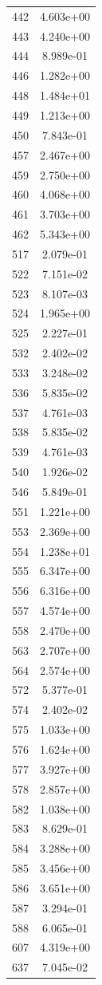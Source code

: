 \documentclass[12pt]{article}
\begin{document}
\begin{longtable}{@{}cc@{}}
442 & 4.603e+00 \\
443 & 4.240e+00 \\
444 & 8.989e-01 \\
446 & 1.282e+00 \\
448 & 1.484e+01 \\
449 & 1.213e+00 \\
450 & 7.843e-01 \\
457 & 2.467e+00 \\
459 & 2.750e+00 \\
460 & 4.068e+00 \\
461 & 3.703e+00 \\
462 & 5.343e+00 \\
517 & 2.079e-01 \\
522 & 7.151e-02 \\
523 & 8.107e-03 \\
524 & 1.965e+00 \\
525 & 2.227e-01 \\
532 & 2.402e-02 \\
533 & 3.248e-02 \\
536 & 5.835e-02 \\
537 & 4.761e-03 \\
538 & 5.835e-02 \\
539 & 4.761e-03 \\
540 & 1.926e-02 \\
546 & 5.849e-01 \\
551 & 1.221e+00 \\
553 & 2.369e+00 \\
554 & 1.238e+01 \\
555 & 6.347e+00 \\
556 & 6.316e+00 \\
557 & 4.574e+00 \\
558 & 2.470e+00 \\
563 & 2.707e+00 \\
564 & 2.574e+00 \\
572 & 5.377e-01 \\
574 & 2.402e-02 \\
575 & 1.033e+00 \\
576 & 1.624e+00 \\
577 & 3.927e+00 \\
578 & 2.857e+00 \\
582 & 1.038e+00 \\
583 & 8.629e-01 \\
584 & 3.288e+00 \\
585 & 3.456e+00 \\
586 & 3.651e+00 \\
587 & 3.294e-01 \\
588 & 6.065e-01 \\
607 & 4.319e+00 \\
637 & 7.045e-02 \\

\bottomrule
\end{longtable}
\end{document}
